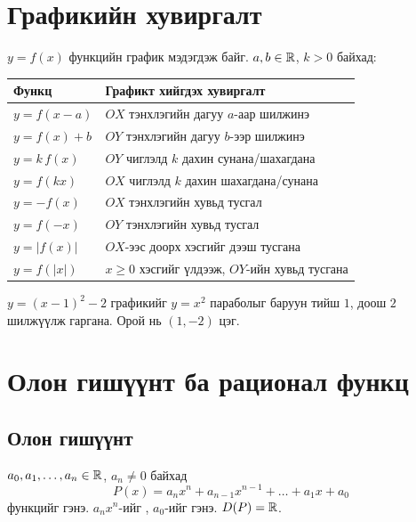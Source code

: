 \section{Графикийн хувиргалт}
$y=f(x)$ функцийн график мэдэгдэж байг. $a,b\in\mathbb{R}$, $k>0$ байхад:
\begin{center}
\renewcommand{\arraystretch}{1.35}
\begin{tabular}{l|l}
Функц & Графикт хийгдэх хувиргалт \\\hline
$y=f(x-a)$ & $OX$ тэнхлэгийн дагуу $a$-аар шилжинэ \\
$y=f(x)+b$ & $OY$ тэнхлэгийн дагуу $b$-ээр шилжинэ \\
$y=k\,f(x)$ & $OY$ чиглэлд $k$ дахин сунана/шахагдана \\
$y=f(kx)$ & $OX$ чиглэлд $k$ дахин шахагдана/сунана \\
$y=-f(x)$ & $OX$ тэнхлэгийн хувьд тусгал \\
$y=f(-x)$ & $OY$ тэнхлэгийн хувьд тусгал \\
$y=|f(x)|$ & $OX$-ээс доорх хэсгийг дээш тусгана \\
$y=f(|x|)$ & $x\ge0$ хэсгийг үлдээж, $OY$-ийн хувьд тусгана
\end{tabular}
\end{center}

\begin{example}
$y=(x-1)^2-2$ графикийг $y=x^2$ параболыг баруун тийш $1$, доош $2$ шилжүүлж гаргана.
Орой нь $(1,-2)$ цэг.
\end{example}

\section{Олон гишүүнт ба рационал функц}

\subsection{Олон гишүүнт}
\begin{definition}
$a_0,a_1,\ldots,a_n\in\mathbb{R}$, $a_n\neq0$ байхад
\[
P(x)=a_nx^n+a_{n-1}x^{n-1}+\dots+a_1x+a_0
\]
функцийг  гэнэ. $a_nx^n$-ийг ,
$a_0$-ийг  гэнэ. $D(P)=\mathbb{R}$.
\end{definition}


